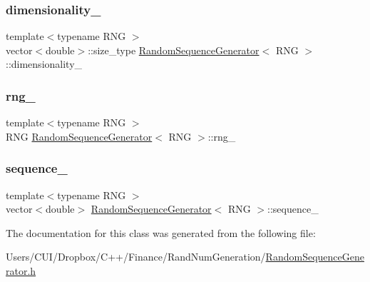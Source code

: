 \subsubsection{\texorpdfstring{dimensionality\+\_\+}{dimensionality\_}}
{\footnotesize\ttfamily template$<$typename R\+NG $>$ \\
vector$<$double$>$\+::size\+\_\+type \hyperlink{class_random_sequence_generator}{Random\+Sequence\+Generator}$<$ R\+NG $>$\+::dimensionality\+\_\+\hspace{0.3cm}{\ttfamily [private]}}

\hypertarget{class_random_sequence_generator_a8a7cbf03d0e0e50f2d4bf571a6654228}{}\label{class_random_sequence_generator_a8a7cbf03d0e0e50f2d4bf571a6654228} 
\subsubsection{\texorpdfstring{rng\+\_\+}{rng\_}}
{\footnotesize\ttfamily template$<$typename R\+NG $>$ \\
R\+NG \hyperlink{class_random_sequence_generator}{Random\+Sequence\+Generator}$<$ R\+NG $>$\+::rng\+\_\+\hspace{0.3cm}{\ttfamily [private]}}

\hypertarget{class_random_sequence_generator_a876cc58b9aa9d48e6a068567356eb6f0}{}\label{class_random_sequence_generator_a876cc58b9aa9d48e6a068567356eb6f0} 
\subsubsection{\texorpdfstring{sequence\+\_\+}{sequence\_}}
{\footnotesize\ttfamily template$<$typename R\+NG $>$ \\
vector$<$double$>$ \hyperlink{class_random_sequence_generator}{Random\+Sequence\+Generator}$<$ R\+NG $>$\+::sequence\+\_\+\hspace{0.3cm}{\ttfamily [private]}}



The documentation for this class was generated from the following file\+:\begin{DoxyCompactItemize}
\item 
Users/\+C\+U\+I/\+Dropbox/\+C++/\+Finance/\+Rand\+Num\+Generation/\hyperlink{_random_sequence_generator_8h}{Random\+Sequence\+Generator.\+h}\end{DoxyCompactItemize}
